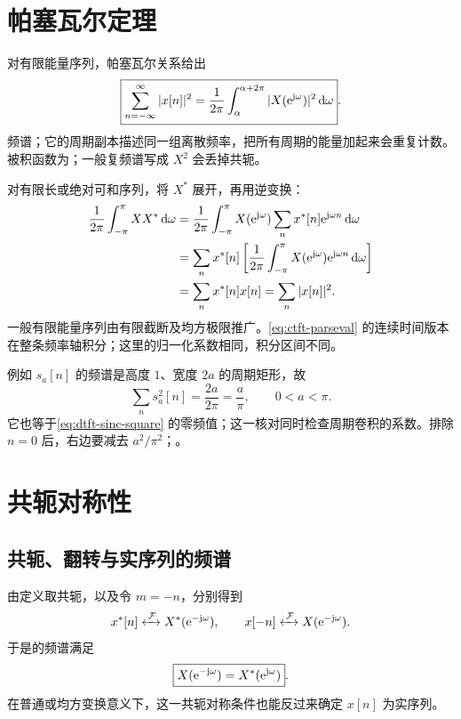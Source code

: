 \section{帕塞瓦尔定理}
\label{sec:dtft-energy-symmetry}

\label{sec:dtft-parseval}

对有限能量序列，帕塞瓦尔关系给出
\begin{equation}
  \boxed{\sum_{n=-\infty}^{\infty}|x[n]|^2
    =\frac1{2\pi}\int_{\alpha}^{\alpha+2\pi}
       |X(\mathrm{e}^{\mathrm{j}\omega})|^2\mathop{}\!\mathrm{d}\omega}.
  \label{eq:dtft-parseval}
\end{equation}
频谱；它的周期副本描述同一组离散频率，把所有周期的能量加起来会重复计数。被积函数为；一般复频谱写成 $X^2$ 会丢掉共轭。

对有限长或绝对可和序列，将 $X^*$ 展开，再用逆变换：
\begin{align*}
  \frac1{2\pi}\int_{-\pi}^{\pi}XX^*\mathop{}\!\mathrm{d}\omega
    &=\frac1{2\pi}\int_{-\pi}^{\pi}
        X(\mathrm{e}^{\mathrm{j}\omega})
        \sum_n x^*[n]\mathrm{e}^{\mathrm{j}\omega n}\mathop{}\!\mathrm{d}\omega\\
    &=\sum_n x^*[n]\left[
        \frac1{2\pi}\int_{-\pi}^{\pi}
          X(\mathrm{e}^{\mathrm{j}\omega})\mathrm{e}^{\mathrm{j}\omega n}\mathop{}\!\mathrm{d}\omega\right]\\
    &=\sum_n x^*[n]x[n]=\sum_n|x[n]|^2.
\end{align*}
一般有限能量序列由有限截断及均方极限推广。\cref{eq:ctft-parseval} 的连续时间版本在整条频率轴积分；这里的归一化系数相同，积分区间不同。

例如 $s_a[n]$ 的频谱是高度 $1$、宽度 $2a$ 的周期矩形，故
\[
  \sum_n s_a^2[n]=\frac{2a}{2\pi}=\frac a\pi,
  \qquad 0<a<\pi.
\]
它也等于\cref{eq:dtft-sinc-square} 的零频值；这一核对同时检查周期卷积的系数。排除 $n=0$ 后，右边要减去 $a^2/\pi^2$；。

\section{共轭对称性}
\label{sec:dtft-symmetry}

\subsection{共轭、翻转与实序列的频谱}
\label{sec:dtft-conjugate-symmetry}

由定义取共轭，以及令 $m=-n$，分别得到
\begin{equation}
  x^*[n]\mathrel{\xleftrightarrow{\,\mathcal{F}\,}} X^*(\mathrm{e}^{-\mathrm{j}\omega}),
  \qquad x[-n]\mathrel{\xleftrightarrow{\,\mathcal{F}\,}} X(\mathrm{e}^{-\mathrm{j}\omega}).
  \label{eq:dtft-conjugation-reversal}
\end{equation}
于是的频谱满足
\begin{equation}
  \boxed{X(\mathrm{e}^{-\mathrm{j}\omega})=X^*(\mathrm{e}^{\mathrm{j}\omega})}.
  \label{eq:dtft-conjugate-symmetry}
\end{equation}
在普通或均方变换意义下，这一共轭对称条件也能反过来确定 $x[n]$ 为实序列。

